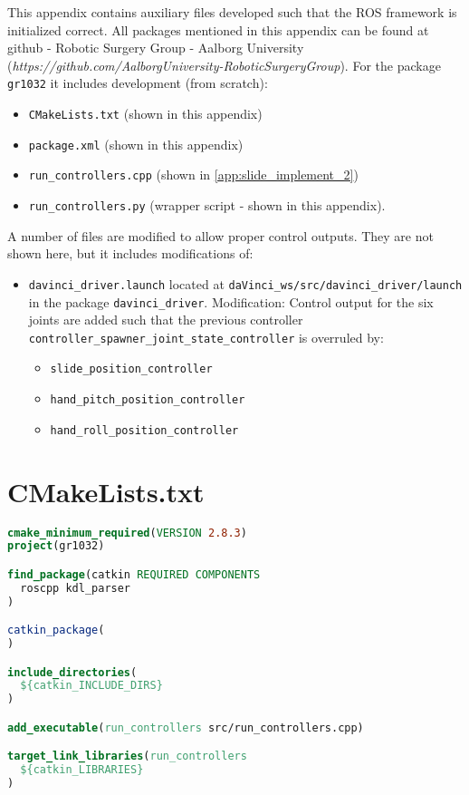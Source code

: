 This appendix contains auxiliary files developed such that the ROS framework is initialized correct. All packages mentioned in this appendix can be found at github - Robotic Surgery Group - Aalborg University (\textit{https://github.com/AalborgUniversity-RoboticSurgeryGroup}). For the package \texttt{gr1032} it includes development (from scratch):
\begin{itemize}
\item \texttt{CMakeLists.txt} (shown in this appendix)
\item \texttt{package.xml} (shown in this appendix)
\item \texttt{run\_controllers.cpp} (shown in \autoref{app:slide_implement_2})
\item \texttt{run\_controllers.py} (wrapper script - shown in this appendix).
\end{itemize}
A number of files are modified to allow proper control outputs. They are not shown here, but it includes  modifications of:
\begin{itemize}
\item \texttt{davinci\_driver.launch} located at \texttt{daVinci\_ws/src/davinci\_driver/launch} in the package \texttt{davinci\_driver}. Modification: Control output for the six joints are added such that the previous controller \texttt{controller\_spawner\_joint\_state\_controller} is overruled by:
\begin{itemize}
\item \texttt{slide\_position\_controller}
\item \texttt{hand\_pitch\_position\_controller}
\item \texttt{hand\_roll\_position\_controller}
\end{itemize}
\end{itemize}
\section*{CMakeLists.txt}
\begin{lstlisting}[language=cmake]
cmake_minimum_required(VERSION 2.8.3)
project(gr1032)

find_package(catkin REQUIRED COMPONENTS
  roscpp kdl_parser
)

catkin_package(
)

include_directories(
  ${catkin_INCLUDE_DIRS}
)

add_executable(run_controllers src/run_controllers.cpp)

target_link_libraries(run_controllers
  ${catkin_LIBRARIES}
)
\end{lstlisting}
